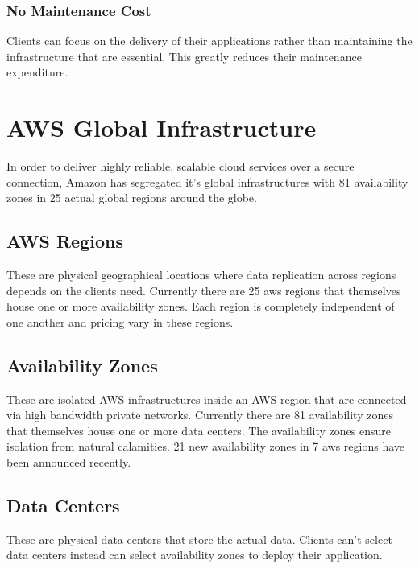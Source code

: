 \documentclass{home_assignment}
\begin{document}
\subsubsection{No Maintenance Cost}
Clients can focus on the delivery of their applications rather than maintaining the infrastructure that are essential. This greatly reduces their maintenance expenditure.

\section{AWS Global Infrastructure}
In order to deliver highly reliable, scalable cloud services over a secure connection, Amazon has segregated it's global infrastructures with 81 availability zones in 25 actual global regions around the globe.
\subsection{AWS Regions}
These are physical geographical locations where data replication across regions depends on the clients need. Currently there are 25 \acrshort{aws} regions that themselves house one or more availability zones. Each region is completely independent of one another and pricing vary in these regions.
\subsection{Availability Zones}
These are isolated AWS infrastructures inside an AWS region that are connected via high bandwidth private networks. Currently there are 81 availability zones that themselves house one or more data centers. The availability zones ensure isolation from natural calamities. 21 new availability zones in 7 \acrshort{aws} regions have been announced recently.
\subsection{Data Centers}
These are physical data centers that store the actual data. Clients can't select data centers instead can select availability zones to deploy their application.
\end{document}

